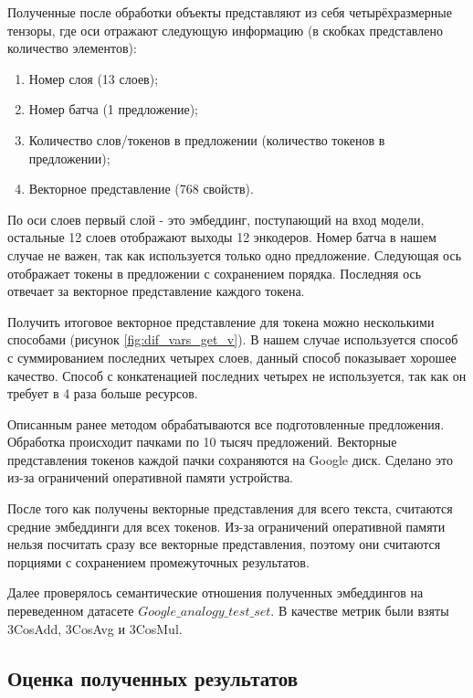 \documentclass[a4paper,14pt]{article}
\begin{document}
	Полученные после обработки объекты представляют из себя четырёхразмерные тензоры, где оси отражают следующую информацию (в скобках представлено количество элементов):
	
	\begin{enumerate}
		
		\item Номер слоя (13 слоев);
		
		\item Номер батча (1 предложение);
		
		\item Количество слов/токенов в предложении (количество токенов в предложении);
		
		\item Векторное представление (768 свойств).

	\end{enumerate}	

	По оси слоев первый слой - это эмбеддинг, поступающий на вход модели, остальные 12 слоев отображают выходы 12 энкодеров.
	Номер батча в нашем случае не важен, так как используется только одно предложение.
	Следующая ось отображает токены в предложении с сохранением порядка.
	Последняя ось отвечает за векторное представление каждого токена.
	
	Получить итоговое векторное представление для токена можно несколькими способами (рисунок \ref{fig:dif_vars_get_v}).
	В нашем случае используется способ с суммированием последних четырех слоев, данный способ показывает хорошее качество.
	Способ с конкатенацией последних четырех не используется, так как он требует в 4 раза больше ресурсов.
	
	Описанным ранее методом обрабатываются все подготовленные предложения.
	Обработка происходит пачками по 10 тысяч предложений.
	Векторные представления токенов каждой пачки сохраняются на Google диск.
	Сделано это из-за ограничений оперативной памяти устройства.
	
	После того как получены векторные представления для всего текста, считаются средние эмбеддинги для всех токенов.
	Из-за ограничений оперативной памяти нельзя посчитать сразу все векторные представления, поэтому они считаются порциями с сохранением промежуточных результатов.
	
	Далее проверялось семантические отношения полученных эмбеддингов на переведенном датасете $Google\_analogy\_test\_set$.
	В качестве метрик были взяты 3CosAdd, 3CosAvg и 3CosMul.
	
	\subsection{Оценка полученных результатов}
	
\end{document}
